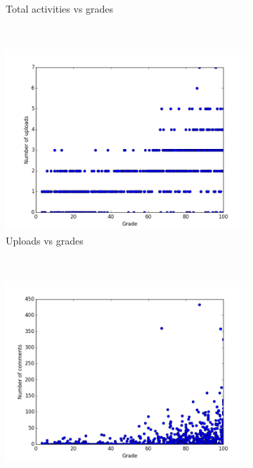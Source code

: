 \documentclass[11pt, oneside]{article}   	%
\begin{document}
\begin{figure}
\begin{subfigure}[b]{0.4\textwidth}
                \caption{Total activities vs grades}
                \label{actVSgrades}
        \end{subfigure}
        ~ %
        \begin{subfigure}[b]{0.4\textwidth}
                \includegraphics[width=\textwidth]{./pythonScripts/generalStatistics/uploads.png}
                \caption{Uploads vs grades}
                \label{Uploads}
        \end{subfigure}
        ~ %
        \begin{subfigure}[b]{0.4\textwidth}
                 \includegraphics[width=\textwidth]{./pythonScripts/generalStatistics/comments.png}

\end{subfigure}
\end{figure}
\end{document}
